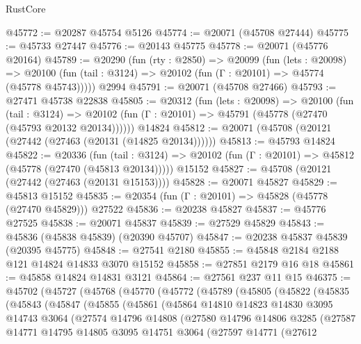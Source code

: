 \begin{lexlean}{RustCore}
\begin{coremodule}
@45772 := @20287 @45754 @5126
@45774 := @20071 (@45708 @27444)
@45775 := @45733 @27447
@45776 := @20143 @45775
@45778 := @20071 (@45776 @20164)
@45789 := @20290
    (fun (rty : @2850) =>
    @20099
      (fun (lets : @20098) =>
      @20100 (fun (tail : @3124) => @20102 (fun (Γ : @20101) => @45774 (@45778 @45743)))))
    @2994
@45791 := @20071 (@45708 @27466)
@45793 := @27471 @45738 @22838
@45805 := @20312
    (fun (lets : @20098) =>
    @20100
      (fun (tail : @3124) =>
      @20102 (fun (Γ : @20101) => @45791 (@45778 (@27470 (@45793 @20132 @20134))))))
    @14824
@45812 := @20071 (@45708 (@20121 (@27442 (@27463 (@20131 (@14825 @20134))))))
@45813 := @45793 @14824
@45822 := @20336
    (fun (tail : @3124) => @20102 (fun (Γ : @20101) => @45812 (@45778 (@27470 (@45813 @20134)))))
    @15152
@45827 := @45708 (@20121 (@27442 (@27463 (@20131 @15153))))
@45828 := @20071 @45827
@45829 := @45813 @15152
@45835 := @20354 (fun (Γ : @20101) => @45828 (@45778 (@27470 @45829))) @27522
@45836 := @20238 @45827
@45837 := @45776 @27525
@45838 := @20071 @45837
@45839 := @27529 @45829
@45843 := @45836 (@45838 @45839) (@20390 @45707)
@45847 := @20238 @45837 @45839 (@20395 @45775)
@45848 := @27541 @2180
@45855 := @45848 @2184 @2188 @121 @14824 @14833 @3070 @15152
@45858 := @27851 @2179 @16 @18
@45861 := @45858 @14824 @14831 @3121
@45864 := @27561 @237 @11 @15
@46375 := @45702
    (@45727
      (@45768
        (@45770
          (@45772
            (@45789
              (@45805
                (@45822
                  (@45835
                    (@45843
                      (@45847
                        (@45855
                          (@45861
                            (@45864
                              @14810
                              @14823
                              @14830
                              @3095
                              @14743
                              @3064
                              (@27574
                                @14796
                                @14808
                                (@27580
                                  @14796
                                  @14806
                                  @3285
                                  (@27587
                                    @14771
                                    @14795
                                    @14805
                                    @3095
                                    @14751
                                    @3064
                                    (@27597
                                      @14771
                                      (@27612

\end{coremodule}
\end{lexlean}
